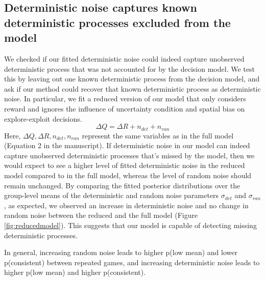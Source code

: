 \documentclass[12pt]{article}
\begin{document}
	\subsection{Deterministic noise captures known deterministic processes excluded from the model}	
	We checked if our fitted deterministic noise could indeed capture unobserved deterministic process that was not accounted for by the decision model. We test this by leaving out one known deterministic process from the decision model, and ask if our method could recover that known deterministic process as deterministic noise. In particular, we fit a reduced version of our model that only considers reward and ignores the influence of uncertainty condition and spatial bias on explore-exploit decisions.  
	$$\Delta Q= \Delta R+n_{det}+n_{ran}$$
	Here, $\Delta Q, \Delta R, n_{det}, n_{ran}$ represent the same variables as in the full model (Equation 2 in the manuscript).	If deterministic noise in our model can indeed capture unobserved deterministic processes that's missed by the model, then we would expect to see a higher level of fitted deterministic noise in the reduced model compared to in the full model, whereas the level of random noise should remain unchanged. By comparing the	fitted posterior distributions over the group-level means of the deterministic and random noise parameters $\sigma_{det}$ and $\sigma_{ran}$, as expected, we observed an increase in deterministic noise and no change in random noise between the reduced and the full model (Figure \ref{fig:reducedmodel}). This suggests that our model is capable of detecting missing deterministic processes.
	
	In general, increasing random noise leads to higher p(low mean) and lower p(consistent) between repeated games, and increasing deterministic noise leads to higher p(low mean) and higher p(consistent). 
	
\end{document}
